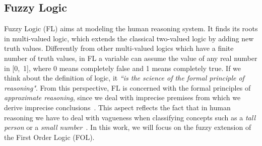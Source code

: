 \subsection{Fuzzy Logic} \label{fuzzy_logic}
Fuzzy Logic (FL) aims at modeling the human reasoning system. It finds its roots in multi-valued logic, which extends the classical two-valued logic by adding new truth values. Differently from other multi-valued logics which have a finite number of truth values, in FL a variable can assume the value of any real number in [0,~1], where 0 means completely false and 1 means completely true.
If we think about the definition of logic, it \emph{``is the science of the formal principle of reasoning"}. From this perspective, FL is concerned with the formal principles of \textit{approximate reasoning}, since we deal with imprecise premises from which we derive imprecise conclusions~\cite{pal1991fuzzy}. This aspect reflects the fact that in human reasoning we have to deal with vagueness when classifying concepts such as a \textit{tall person} or a \textit{small number}~\cite{hajek1998basic, novak2012mathematical}. In this work, we will focus on the fuzzy extension of the First Order Logic (FOL).

